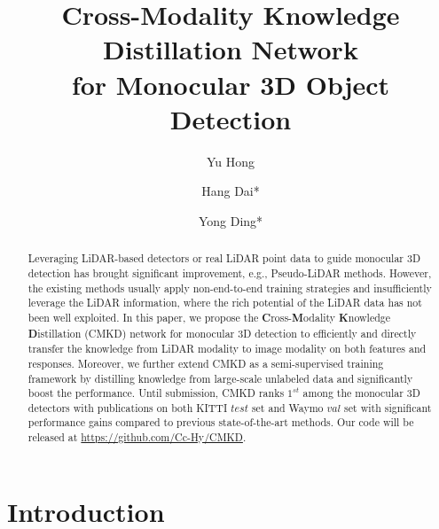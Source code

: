 \documentclass[runningheads]{llncs}
\begin{document}
\pagestyle{headings}
\mainmatter
\def\ECCVSubNumber{4878}  \title{Cross-Modality Knowledge Distillation Network \\ for Monocular 3D Object Detection}


\begin{comment}
\titlerunning{ECCV-22 submission ID \ECCVSubNumber} 
\authorrunning{ECCV-22 submission ID \ECCVSubNumber} 
\author{Anonymous ECCV submission}
\institute{Paper ID \ECCVSubNumber}
\end{comment}




\author{Yu Hong \and
Hang Dai* \and
Yong Ding*}
\maketitle
\begin{abstract}
Leveraging LiDAR-based detectors or real LiDAR point data to guide monocular 3D detection has brought significant improvement, e.g., Pseudo-LiDAR methods.
However, the existing methods usually apply non-end-to-end training strategies and insufficiently leverage the LiDAR information, where the rich potential of the LiDAR data has not been well exploited.
In this paper, we propose the \textbf{C}ross-\textbf{M}odality \textbf{K}nowledge \textbf{D}istillation (CMKD) network for monocular 3D detection to efficiently and directly transfer the knowledge from LiDAR modality to image modality on both features and responses.
Moreover, we further extend CMKD as a semi-supervised training framework by distilling knowledge from large-scale unlabeled data and significantly boost the performance.
Until submission, CMKD ranks $1^{st}$ among the monocular 3D detectors with publications on both KITTI $test$ set and Waymo $val$ set with significant performance gains compared to previous state-of-the-art methods.
Our code will be released at \url{https://github.com/Cc-Hy/CMKD}.
\end{abstract}


\section{Introduction}
\end{document}
